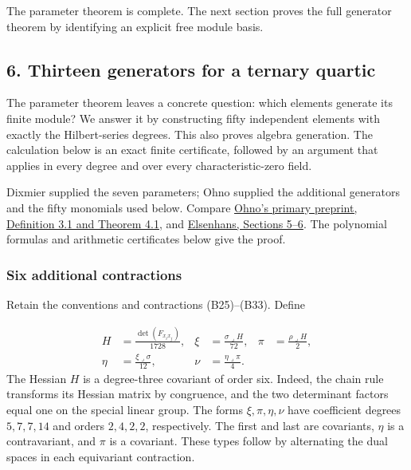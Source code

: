 \documentclass[
]{article}
\begin{document}
The parameter theorem is complete. The next section proves the full
generator theorem by identifying an explicit free module basis.

\subsection{6. Thirteen generators for a ternary
quartic}\label{section-6}

The parameter theorem leaves a concrete question: which elements
generate its finite module? We answer it by constructing fifty
independent elements with exactly the Hilbert-series degrees. This also
proves algebra generation. The calculation below is an exact finite
certificate, followed by an argument that applies in every degree and
over every characteristic-zero field.

Dixmier supplied the seven parameters; Ohno supplied the additional
generators and the fifty monomials used below. Compare
\href{https://aeb.win.tue.nl/math/ohno-preprint.2007.05.15.pdf}{Ohno's
primary preprint, Definition 3.1 and Theorem 4.1}, and
\href{https://math.uni-paderborn.de/fileadmin-eim/mathematik/AG-Computeralgebra/Publications-elsenhans/inv_pl_quart_5a.pdf}{Elsenhans,
Sections 5--6}. The polynomial formulas and arithmetic certificates
below give the proof.

\subsubsection{Six additional
contractions}\label{six-additional-contractions}

Retain the conventions and contractions (B25)--(B33). Define
\protect{}\label{equation-B46}{}

\[
\begin{aligned}
H&=\frac{\det(F_{x_i x_j})}{1728},&
\xi&=\frac{\sigma\mathbin{\lrcorner}H}{72},&
\pi&=\frac{\rho\mathbin{\lrcorner}H}{2},\\
\eta&=\frac{\xi\mathbin{\lrcorner}\sigma}{12},&
\nu&=\frac{\eta\mathbin{\lrcorner}\pi}{4}.
\end{aligned}
\tag{B46}
\] The Hessian \(H\) is a degree-three covariant of order six. Indeed,
the chain rule transforms its Hessian matrix by congruence, and the two
determinant factors equal one on the special linear group. The forms
\(\xi,\pi,\eta,\nu\) have coefficient degrees \(5,7,7,14\) and orders
\(2,4,2,2\), respectively. The first and last are covariants, \(\eta\)
is a contravariant, and \(\pi\) is a covariant. These types follow by
alternating the dual spaces in each equivariant contraction.
\end{document}
